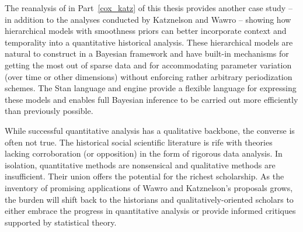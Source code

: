 The reanalysis of  in Part~\ref{cox_katz} of this thesis 
provides another case study -- in addition to the analyses conducted by Katznelson and 
Wawro -- showing how hierarchical models with smoothness priors can better incorporate 
context and temporality into a quantitative historical analysis. These hierarchical models are 
natural to construct in a Bayesian framework and have built-in mechanisms for getting the most
out of sparse data and for accommodating parameter variation (over time or other dimensions) 
without enforcing rather arbitrary periodization schemes. The Stan language and engine provide 
a flexible language for expressing these models and enables full Bayesian inference to be carried 
out more efficiently than previously possible.  

While successful quantitative analysis has a qualitative backbone, the converse
is often not true. The historical social scientific literature is rife with 
theories lacking corroboration (or opposition) in the form of rigorous 
data analysis. In isolation, quantitative methods are nonsensical and
qualitative methods are insufficient. Their union offers the potential for the richest 
scholarship.  As the inventory of promising applications of Wawro and 
Katznelson's proposals grows, the burden will shift back to the historians and 
qualitatively-oriented scholars to either embrace the progress in quantitative analysis 
or provide informed critiques supported by statistical theory. 

